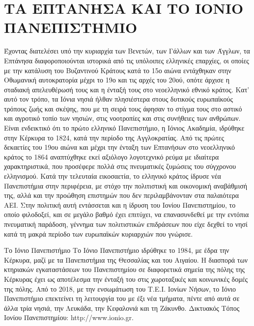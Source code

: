 \hypertarget{ux3c4ux3b1-ux3b5ux3c0ux3c4ux3b1ux3bdux3b7ux3c3ux3b1-ux3baux3b1ux3b9-ux3c4ux3bf-ux3b9ux3bfux3bdux3b9ux3bf-ux3c0ux3b1ux3bdux3b5ux3c0ux3b9ux3c3ux3c4ux3b7ux3bcux3b9ux3bf}{%
\section{ΤΑ ΕΠΤΑΝΗΣΑ ΚΑΙ ΤΟ ΙΟΝΙΟ
ΠΑΝΕΠΙΣΤΗΜΙΟ}\label{ux3c4ux3b1-ux3b5ux3c0ux3c4ux3b1ux3bdux3b7ux3c3ux3b1-ux3baux3b1ux3b9-ux3c4ux3bf-ux3b9ux3bfux3bdux3b9ux3bf-ux3c0ux3b1ux3bdux3b5ux3c0ux3b9ux3c3ux3c4ux3b7ux3bcux3b9ux3bf}}

Έχοντας διατελέσει υπό την κυριαρχία των Βενετών, των Γάλλων και των
Άγγλων, τα Επτάνησα διαφοροποιούνται ιστορικά από τις υπόλοιπες
ελληνικές επαρχίες, οι οποίες με την κατάλυση του Βυζαντινού Κράτους
κατά το 15ο αιώνα εντάχθηκαν στην Οθωμανική αυτοκρατορία μέχρι το 19ο
και τις αρχές του 20ού, οπότε άρχισε η σταδιακή απελευθέρωσή τους και η
ένταξή τους στο νεοελληνικό εθνικό κράτος. Κατ' αυτό τον τρόπο, τα Ιόνια
νησιά ήλθαν πλησιέστερα στους δυτικούς ευρωπαϊκούς τρόπους ζωής και
σκέψης, που με τη σειρά τους άφησαν το στίγμα τους στο αστικό και
αγροτικό τοπίο των νησιών, στις νοοτροπίες και στις συνήθειες των
ανθρώπων. Είναι ενδεικτικό ότι το πρώτο ελληνικό Πανεπιστήμιο, η Ιόνιος
Ακαδημία, ιδρύθηκε στην Κέρκυρα το 1824, κατά την περίοδο της
Αγγλοκρατίας. Από τις πρώτες δεκαετίες του 19ου αιώνα και μέχρι την
ένταξη των Επτανήσων στο νεοελληνικό κράτος το 1864 αναπτύχθηκε εκεί
αξιόλογο λογοτεχνικό ρεύμα με ιδιαίτερα χαρακτηριστικά, που προσέφερε
πολλά στις πνευματικές ζυμώσεις του σύγχρονου ελληνισμού. Κατά την
τελευταία εικοσαετία, το ελληνικό κράτος ίδρυσε νέα Πανεπιστήμια στην
περιφέρεια, με στόχο την πολιτιστική και οικονομική αναβάθμισή της, αλλά
και την προώθηση επιστημών που δεν περιλαμβάνονταν στα παλαιότερα ΑΕΙ.
Στην πολιτική αυτή εντάσσεται και η ίδρυση του Ιονίου Πανεπιστημίου, το
οποίο φιλοδοξεί, και σε μεγάλο βαθμό έχει επιτύχει, να επανασυνδεθεί με
την εντόπια πνευματική παράδοση, γέννημα των πολιτιστικών επιδράσεων που
είχε δεχθεί το νησί κατά τη μακρά περίοδο των ευρωπαϊκών κυριαρχιών που
γνώρισε.

Το Ιόνιο Πανεπιστήμιο Το Ιόνιο Πανεπιστήμιο ιδρύθηκε το 1984, με έδρα
την Κέρκυρα, μαζί με τα Πανεπιστήμια της Θεσσαλίας και του Αιγαίου. H
διασπορά των κτηριακών εγκαταστάσεων του Πανεπιστημίου σε διαφορετικά
σημεία της πόλης της Κέρκυρας έχει ως αποτέλεσμα την ένταξή του στις
χωροταξικές και κοινωνικές δομές της πόλης. Από το 2018, με την
ενσωμάτωση του Τ.Ε.Ι. Ιονίων Νήσων, το Ιόνιο Πανεπιστήμιο επεκτείνει τη
λειτουργία του με έξι νέα τμήματα, πέντε από αυτά σε άλλα τρία νησιά,
την Λευκάδα, την Κεφαλονιά και τη Ζάκυνθο. Δικτυακός Τόπος Ιονίου
Πανεπιστημίου: http://www.ionio.gr.

